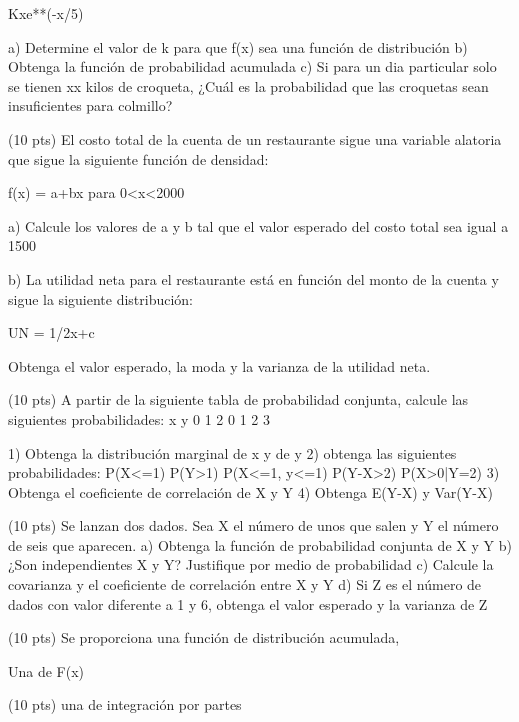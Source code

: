 \documentclass[addpoints]{exam}
\theoremstyle{mytheor}
\begin{document}
\begin{questions}
Kxe**(-x/5)

a) Determine el valor de k para que f(x) sea una función de distribución
b) Obtenga la función de probabilidad acumulada
c) Si para un dia particular solo se tienen xx kilos de croqueta, ¿Cuál es la probabilidad que las croquetas sean insuficientes para colmillo?

\question (10 pts) 
El costo total de la cuenta de un restaurante sigue una variable alatoria que sigue la siguiente función de densidad:

f(x) = a+bx  para 0<x<2000

a) Calcule los valores de a y b tal que el valor esperado del costo total sea igual a 1500

b) La utilidad neta para el restaurante está en función del monto de la cuenta y sigue la siguiente distribución: 

UN = 1/2x+c

Obtenga el valor esperado, la moda y la varianza de la utilidad neta.

\question (10 pts) 
A partir de la siguiente tabla de probabilidad conjunta, calcule las siguientes probabilidades:
     x
y  0 1 2 
0
1
2
3

1) Obtenga la distribución marginal de x y de y
2) obtenga las siguientes probabilidades:
P(X<=1)
P(Y>1)
P(X<=1, y<=1)
P(Y-X>2)
P(X>0|Y=2)
3) Obtenga el coeficiente de correlación de X y Y
4) Obtenga E(Y-X) y Var(Y-X)

\question (10 pts) 
Se lanzan dos dados. Sea X el número de unos que salen y Y el número de seis que aparecen.
a) Obtenga la función de probabilidad conjunta de X y Y
b) ¿Son independientes X y Y? Justifique por medio de probabilidad
c) Calcule la covarianza y el coeficiente de correlación entre X y Y
d) Si Z es el número de dados con valor diferente a 1 y 6, obtenga el valor esperado y la varianza de Z

\question (10 pts) 
Se proporciona una función de distribución acumulada, 

Una de F(x)

\question (10 pts) 
una de integración por partes





\end{questions} 
\end{document}
